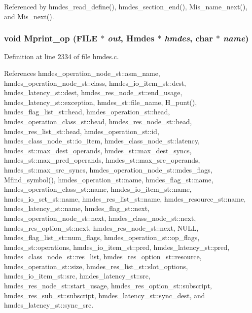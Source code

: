Referenced by hmdes\_\-read\_\-define(), hmdes\_\-section\_\-end(), Mis\_\-name\_\-next(), and Mis\_\-next().
\subsubsection{\setlength{\rightskip}{0pt plus 5cm}void Mprint\_\-op (FILE $\ast$ {\em out}, \bf{Hmdes} $\ast$ {\em hmdes}, char $\ast$ {\em name})}\label{hmdes_8c_009c16532ab5e1731f3a41830e88f47d}




Definition at line 2334 of file hmdes.c.

References hmdes\_\-operation\_\-node\_\-st::asm\_\-name, hmdes\_\-operation\_\-node\_\-st::class, hmdes\_\-io\_\-item\_\-st::dest, hmdes\_\-latency\_\-st::dest, hmdes\_\-res\_\-node\_\-st::end\_\-usage, hmdes\_\-latency\_\-st::exception, hmdes\_\-st::file\_\-name, H\_\-punt(), hmdes\_\-flag\_\-list\_\-st::head, hmdes\_\-operation\_\-st::head, hmdes\_\-operation\_\-class\_\-st::head, hmdes\_\-res\_\-node\_\-st::head, hmdes\_\-res\_\-list\_\-st::head, hmdes\_\-operation\_\-st::id, hmdes\_\-class\_\-node\_\-st::io\_\-item, hmdes\_\-class\_\-node\_\-st::latency, hmdes\_\-st::max\_\-dest\_\-operands, hmdes\_\-st::max\_\-dest\_\-syncs, hmdes\_\-st::max\_\-pred\_\-operands, hmdes\_\-st::max\_\-src\_\-operands, hmdes\_\-st::max\_\-src\_\-syncs, hmdes\_\-operation\_\-node\_\-st::mdes\_\-flags, Mfind\_\-symbol(), hmdes\_\-operation\_\-st::name, hmdes\_\-flag\_\-st::name, hmdes\_\-operation\_\-class\_\-st::name, hmdes\_\-io\_\-item\_\-st::name, hmdes\_\-io\_\-set\_\-st::name, hmdes\_\-res\_\-list\_\-st::name, hmdes\_\-resource\_\-st::name, hmdes\_\-latency\_\-st::name, hmdes\_\-flag\_\-st::next, hmdes\_\-operation\_\-node\_\-st::next, hmdes\_\-class\_\-node\_\-st::next, hmdes\_\-res\_\-option\_\-st::next, hmdes\_\-res\_\-node\_\-st::next, NULL, hmdes\_\-flag\_\-list\_\-st::num\_\-flags, hmdes\_\-operation\_\-st::op\_\-flags, hmdes\_\-st::operations, hmdes\_\-io\_\-item\_\-st::pred, hmdes\_\-latency\_\-st::pred, hmdes\_\-class\_\-node\_\-st::res\_\-list, hmdes\_\-res\_\-option\_\-st::resource, hmdes\_\-operation\_\-st::size, hmdes\_\-res\_\-list\_\-st::slot\_\-options, hmdes\_\-io\_\-item\_\-st::src, hmdes\_\-latency\_\-st::src, hmdes\_\-res\_\-node\_\-st::start\_\-usage, hmdes\_\-res\_\-option\_\-st::subscript, hmdes\_\-res\_\-sub\_\-st::subscript, hmdes\_\-latency\_\-st::sync\_\-dest, and hmdes\_\-latency\_\-st::sync\_\-src.
